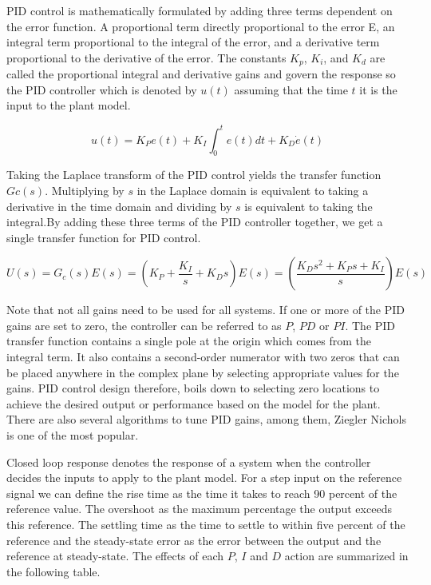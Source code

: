 PID control is mathematically formulated by adding three terms dependent on the error function. A proportional term directly proportional to the error E, an integral term proportional to the integral of the error, and a derivative term proportional to the derivative of the error. The constants $K_p$, $K_i$, and $K_d$ are called the proportional integral and derivative gains and govern the response so the PID controller which is denoted by $u(t)$ assuming that the time $t$ it is the input to the plant model. 

\begin{equation}
u(t) = K_P e(t) + K_I \int_{0}^{t}e(t)dt + K_D \dot{e}(t)
\end{equation}

Taking the Laplace transform of the PID control yields the transfer function $Gc(s)$. 
Multiplying by $s$ in the Laplace domain is equivalent to taking a derivative in the time domain and dividing by $s$ is equivalent to taking the integral.By adding these three terms of the PID controller together, we get a single transfer function for PID control. 

\begin{equation}
U(s) = G_c(s)E(s) = ( K_P + \frac{K_I}{s} + K_D s)E(s) = (\frac{K_D s^2 + K_Ps + K_I}{s})E(s)
\end{equation}

Note that not all gains need to be used for all systems. If one or more of the PID gains are set to zero, the controller can be referred to as $P$, $PD$ or $PI$. The PID transfer function contains a single pole at the origin which comes from the integral term. It also contains a second-order numerator with two zeros that can be placed anywhere in the complex plane by selecting appropriate values for the gains. PID control design therefore, boils down to selecting zero locations to achieve the desired output or performance based on the model for the plant. There are also several algorithms to tune PID gains, among them, Ziegler Nichols is one of the most popular. 


Closed loop response denotes the response of a system when the controller decides the inputs to apply to the plant model. For a step input on the reference signal we can define the rise time as the time it takes to reach 90 percent of the reference value. The overshoot as the maximum percentage the output exceeds this reference. The settling time as the time to settle to within five percent of the reference and the steady-state error as the error between the output and the reference at steady-state. The effects of each $P$, $I$ and $D$ action are summarized in the following table. 


